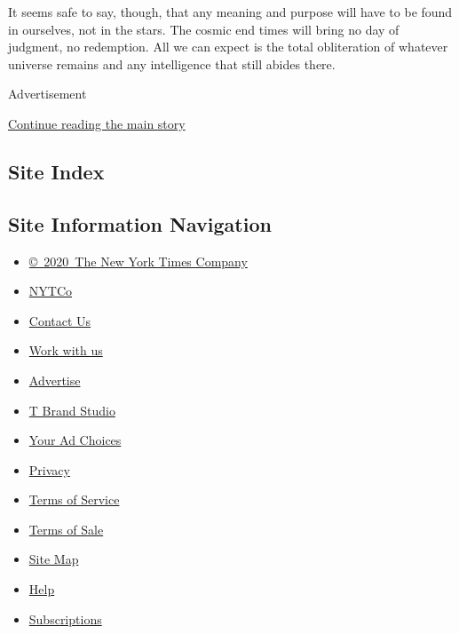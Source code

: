 It seems safe to say, though, that any meaning and purpose will have to
be found in ourselves, not in the stars. The cosmic end times will bring
no day of judgment, no redemption. All we can expect is the total
obliteration of whatever universe remains and any intelligence that
still abides there.

Advertisement

\protect\hyperlink{after-bottom}{Continue reading the main story}

\hypertarget{site-index}{%
\subsection{Site Index}\label{site-index}}

\hypertarget{site-information-navigation}{%
\subsection{Site Information
Navigation}\label{site-information-navigation}}

\begin{itemize}
\tightlist
\item
  \href{https://help.nytimes.com/hc/en-us/articles/115014792127-Copyright-notice}{©~2020~The
  New York Times Company}
\end{itemize}

\begin{itemize}
\tightlist
\item
  \href{https://www.nytco.com/}{NYTCo}
\item
  \href{https://help.nytimes.com/hc/en-us/articles/115015385887-Contact-Us}{Contact
  Us}
\item
  \href{https://www.nytco.com/careers/}{Work with us}
\item
  \href{https://nytmediakit.com/}{Advertise}
\item
  \href{http://www.tbrandstudio.com/}{T Brand Studio}
\item
  \href{https://www.nytimes.com/privacy/cookie-policy\#how-do-i-manage-trackers}{Your
  Ad Choices}
\item
  \href{https://www.nytimes.com/privacy}{Privacy}
\item
  \href{https://help.nytimes.com/hc/en-us/articles/115014893428-Terms-of-service}{Terms
  of Service}
\item
  \href{https://help.nytimes.com/hc/en-us/articles/115014893968-Terms-of-sale}{Terms
  of Sale}
\item
  \href{https://spiderbites.nytimes.com}{Site Map}
\item
  \href{https://help.nytimes.com/hc/en-us}{Help}
\item
  \href{https://www.nytimes.com/subscription?campaignId=37WXW}{Subscriptions}
\end{itemize}
